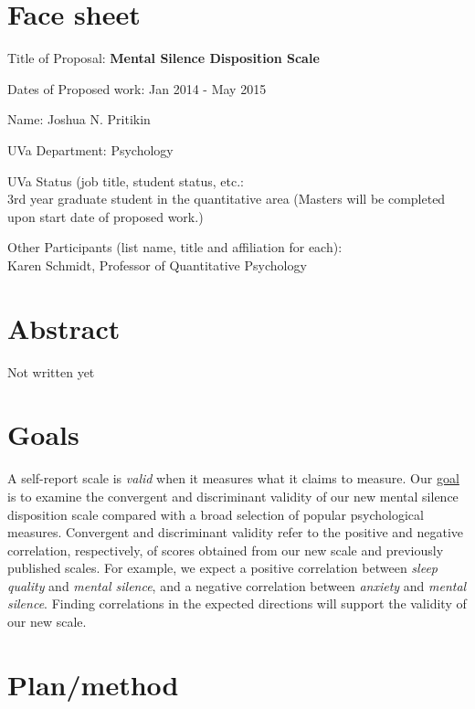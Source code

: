 \documentclass[12pt]{article}
\begin{document}
\setlength{\parindent}{0cm}
\setlength{\parskip}{1cm plus4mm minus3mm}

\section{Face sheet}

Title of Proposal: \textbf{Mental Silence Disposition Scale}

Dates of Proposed work: Jan 2014 - May 2015

Name: Joshua N. Pritikin

UVa Department: Psychology

UVa Status (job title, student status, etc.: \\
3rd year graduate student in the quantitative area (Masters will be completed upon start date of proposed work.)

Other Participants (list name, title and affiliation for each): \\
Karen Schmidt, Professor of Quantitative Psychology

\break

\setlength{\parskip}{1ex plus2mm minus1mm}

\section{Abstract}

Not written yet

\section{Goals}

A self-report scale is \emph{valid} when it measures what it claims to measure.
Our \ul{goal} is to examine the convergent and discriminant validity of our new mental
silence disposition scale compared with a broad selection of popular
psychological measures. Convergent and discriminant validity refer to
the positive and negative correlation, respectively, of scores
obtained from our new scale and previously published scales.
For example, we expect a positive correlation between \emph{sleep quality} and \emph{mental silence},
and a negative correlation between \emph{anxiety} and \emph{mental silence}.
Finding correlations in the expected directions will support the validity of our new scale.

\section{Plan/method}
\end{document}
